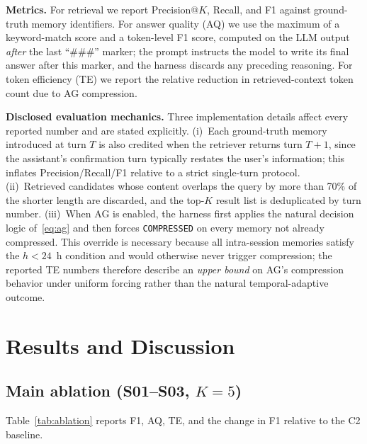 \documentclass[conference]{IEEEtran}
\begin{document}
\textbf{Metrics.} For retrieval we report Precision@$K$, Recall, and F1 against ground-truth memory identifiers. For answer quality (AQ) we use the maximum of a keyword-match score and a token-level F1 score, computed on the LLM output \emph{after} the last ``\#\#\#'' marker; the prompt instructs the model to write its final answer after this marker, and the harness discards any preceding reasoning. For token efficiency (TE) we report the relative reduction in retrieved-context token count due to AG compression.

\textbf{Disclosed evaluation mechanics.} Three implementation details affect every reported number and are stated explicitly. (i)~Each ground-truth memory introduced at turn $T$ is also credited when the retriever returns turn $T{+}1$, since the assistant's confirmation turn typically restates the user's information; this inflates Precision/Recall/F1 relative to a strict single-turn protocol. (ii)~Retrieved candidates whose content overlaps the query by more than 70\% of the shorter length are discarded, and the top-$K$ result list is deduplicated by turn number. (iii)~When AG is enabled, the harness first applies the natural decision logic of~\eqref{eq:ag} and then forces \texttt{COMPRESSED} on every memory not already compressed. This override is necessary because all intra-session memories satisfy the $h<24$~h condition and would otherwise never trigger compression; the reported TE numbers therefore describe an \emph{upper bound} on AG's compression behavior under uniform forcing rather than the natural temporal-adaptive outcome.

\section{Results and Discussion}
\label{sec:results}

\subsection{Main ablation (S01--S03, $K{=}5$)}

Table~\ref{tab:ablation} reports F1, AQ, TE, and the change in F1 relative to the C2 baseline.
\end{document}
